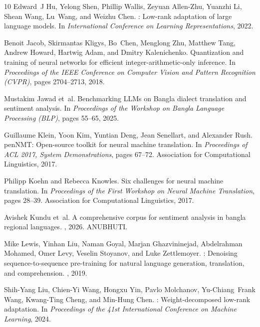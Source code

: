 \documentclass[12pt,a4paper]{article}
\begin{document}
\begin{thebibliography}{10}
Edward~J Hu, Yelong Shen, Phillip Wallis, Zeyuan Allen-Zhu, Yuanzhi Li, Shean
  Wang, Lu~Wang, and Weizhu Chen.
: Low-rank adaptation of large language models.
\newblock In {\em International Conference on Learning Representations}, 2022.

Benoit Jacob, Skirmantas Kligys, Bo~Chen, Menglong Zhu, Matthew Tang, Andrew
  Howard, Hartwig Adam, and Dmitry Kalenichenko.
\newblock Quantization and training of neural networks for efficient
  integer-arithmetic-only inference.
\newblock In {\em Proceedings of the IEEE Conference on Computer Vision and
  Pattern Recognition (CVPR)}, pages 2704--2713, 2018.

Mustakim Jawad et~al.
\newblock Benchmarking {LLM}s on {B}angla dialect translation and sentiment
  analysis.
\newblock In {\em Proceedings of the Workshop on Bangla Language Processing
  (BLP)}, pages 55--65, 2025.

Guillaume Klein, Yoon Kim, Yuntian Deng, Jean Senellart, and Alexander Rush.
pen{NMT}: Open-source toolkit for neural machine translation.
\newblock In {\em Proceedings of ACL 2017, System Demonstrations}, pages
  67--72. Association for Computational Linguistics, 2017.

Philipp Koehn and Rebecca Knowles.
\newblock Six challenges for neural machine translation.
\newblock In {\em Proceedings of the First Workshop on Neural Machine
  Translation}, pages 28--39. Association for Computational Linguistics, 2017.

Avishek Kundu et~al.
\newblock A comprehensive corpus for sentiment analysis in bangla regional
  languages.
, 2026.
\newblock ANUBHUTI.

Mike Lewis, Yinhan Liu, Naman Goyal, Marjan Ghazvininejad, Abdelrahman Mohamed,
  Omer Levy, Veselin Stoyanov, and Luke Zettlemoyer.
: Denoising sequence-to-sequence pre-training for natural
  language generation, translation, and comprehension.
, 2019.

Shih-Yang Liu, Chien-Yi Wang, Hongxu Yin, Pavlo Molchanov, Yu-Chiang~Frank
  Wang, Kwang-Ting Cheng, and Min-Hung Chen.
: Weight-decomposed low-rank adaptation.
\newblock In {\em Proceedings of the 41st International Conference on Machine
  Learning}, 2024.


\end{thebibliography}
\end{document}
